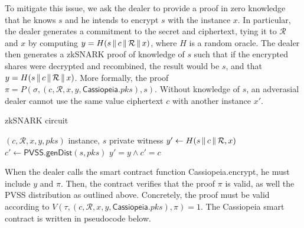 To mitigate this issue, we ask the dealer to provide a proof in zero knowledge that he knows $s$ and he intends to encrypt $s$ with the instance $x$.
In particular, the dealer generates a commitment to the secret and ciphertext, tying it to $\mathcal{R}$ and $x$ by computing $y = H(s \,\|\, c \,\|\, \mathcal{R} \,\|\, x)$, where $H$ is a random oracle.
The dealer then generates a zkSNARK proof of knowledge of $s$ such that if the encrypted shares were decrypted and recombined, the result would be $s$, and that $y = H(s \,\|\, c \,\|\, \mathcal{R} \,\|\, x)$.
More formally, the proof $\pi = P(\sigma, (c, \mathcal{R}, x, y, \textsf{Cassiopeia}.pks), s)$.
Without knowledge of $s$, an adverasial dealer cannot use the same value ciphertext $c$ with another instance $x'$.

\begin{algorithm}
    \caption{zkSNARK circuit}
    \label{alg:snark_circuit}
    \begin{algorithmic}[1]
        \Require $(c, \mathcal{R}, x, y, pks)$ instance, $s$ private witness
        \State $y' \gets H(s \,\|\, c \,\|\, \mathcal{R}, x)$
        \State $c' \gets \textsf{PVSS.genDist}(s, pks)$
        \State \Return $y' = y \land c' = c$
    \end{algorithmic}
\end{algorithm}

When the dealer calls the smart contract function \textsf{Cassiopeia.encrypt}, he must include $y$ and $\pi$.
Then, the contract verifies that the proof $\pi$ is valid, as well the PVSS distribution as outlined above.
Concretely, the proof must be valid according to $V(\tau, (c, \mathcal{R}, x, y, \textsf{Cassiopeia}.pks), \pi) = 1$.
The Cassiopeia smart contract is written in pseudocode below.

